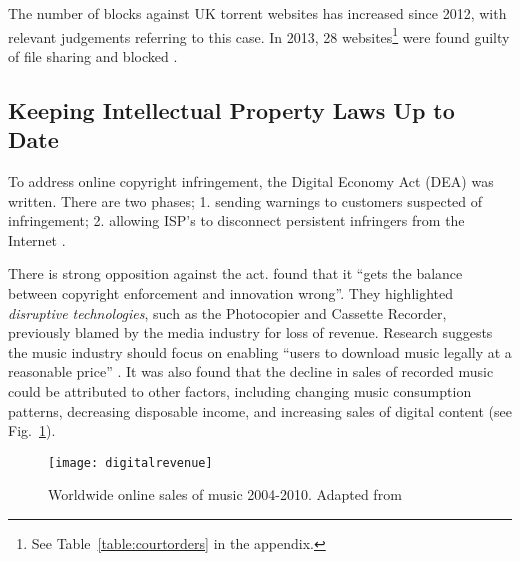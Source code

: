 The number of blocks against UK \gls{torrent} websites has increased since 2012, with relevant judgements referring to this case. In 2013, 28 websites\footnote{See Table~\ref{table:courtorders} in the appendix.} were found guilty of file sharing and blocked \citep{emivsisp, footballvseztv, skycopyright, bbcblock21, bbcblocks2, meale2013premier}.

\subsection[Keeping IP Laws Up to Date]{Keeping Intellectual Property Laws Up to Date}


To address online copyright infringement, the Digital Economy Act (DEA) was written. There are two phases; 1. sending warnings to customers suspected of infringement;
2. allowing ISP's to disconnect persistent infringers from the Internet \citep{dea2010}.

There is strong opposition against the act. \citet{lse2011} found that it ``gets the balance between copyright enforcement and innovation wrong''. They highlighted \textit{disruptive technologies}, such as the Photocopier and Cassette Recorder, previously blamed by the media industry for loss of revenue. %
Research suggests the music industry should focus on enabling ``users to download music legally at a reasonable price'' \citep{lse2011}.
%
It was also found that the decline in sales of recorded music could be attributed to other factors, including changing music consumption patterns, decreasing disposable income, and increasing sales of digital content (see Fig.~\ref{fig:digitalrevenue}).

\begin{figure}[h]
    \centering
    \texttt{[image: digitalrevenue]}
    \caption{Worldwide online sales of music 2004-2010. Adapted from \citet[Fig. 3]{lse2011}}
    \label{fig:digitalrevenue}
\end{figure}


